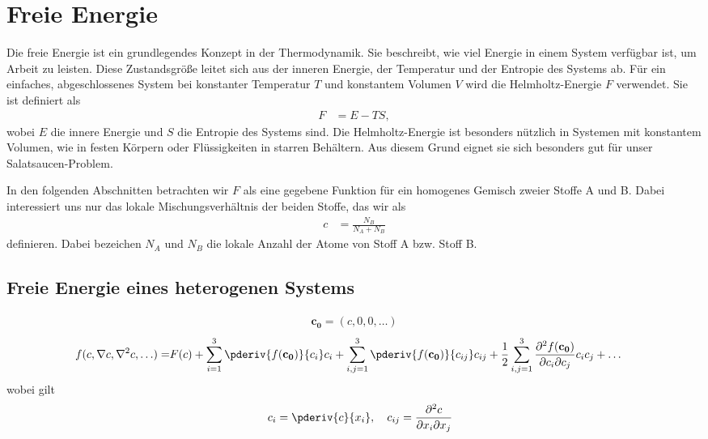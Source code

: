 %
%
%
%
\section{Freie Energie\label{cahnhilliard:section:energie}}

Die freie Energie ist ein grundlegendes Konzept in der Thermodynamik.
Sie beschreibt,
wie viel Energie in einem System verfügbar ist,
um Arbeit zu leisten.
Diese Zustandsgröße leitet sich aus der inneren Energie,
der Temperatur und der Entropie des Systems ab.
Für ein einfaches,
abgeschlossenes System bei konstanter Temperatur $T$
und konstantem Volumen $V$ wird die Helmholtz-Energie $F$ verwendet.
Sie ist definiert als
\begin{align*}
F
& =
E - TS,
\end{align*}
wobei $E$ die innere Energie und $S$ die Entropie des Systems sind.
Die Helmholtz-Energie ist besonders nützlich in Systemen mit konstantem Volumen,
wie in festen Körpern oder Flüssigkeiten in starren Behältern.
Aus diesem Grund eignet sie sich besonders gut für unser Salatsaucen-Problem.

In den folgenden Abschnitten betrachten wir $F$ als eine gegebene Funktion
für ein homogenes Gemisch zweier Stoffe A und B.
Dabei interessiert uns nur das lokale Mischungsverhältnis der beiden Stoffe,
das wir als
\begin{align*}
c
& =
\frac{N_B}{N_A + N_B}
\end{align*}
definieren.
Dabei bezeichen $N_A$ und $N_B$ die lokale Anzahl der Atome von Stoff A bzw. Stoff B.

\subsection{Freie Energie eines heterogenen Systems}

\begin{align*}
\mathbf{c_0} = (c, 0, 0, \ldots)
\end{align*}
\begin{align*}
f(c, \nabla c, \nabla^2 c, \ldots)
=
& F(c)
+ \sum_{i=1}^3 \pderiv{f(\mathbf{c_0})}{c_i} c_i
+ \sum_{i,j=1}^3 \pderiv{f(\mathbf{c_0})}{c_{ij}} c_{ij}
+ \frac{1}{2} \sum_{i,j=1}^3 \frac{\partial^2 f(\mathbf{c_0})}{%
\partial c_i \partial c_j} c_{i} c_{j}
+ \ldots
\end{align*}
wobei gilt
\begin{align*}
\quad
c_i
=
\pderiv{c}{x_i}
,\quad
c_{ij}
=
\frac{\partial^2 c}{\partial x_i \partial x_j}
\end{align*}

